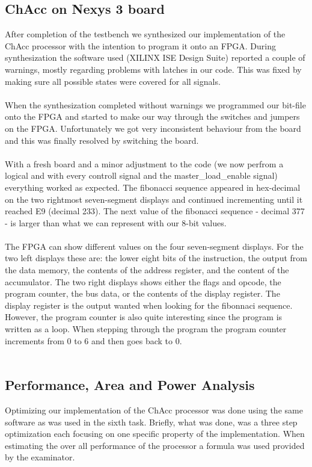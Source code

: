 \documentclass[a4paper,11pt]{article}
\begin{document}
\subsection{ChAcc on Nexys 3 board}
After completion of the testbench we synthesized our implementation of the 
ChAcc processor with the intention to program it onto an FPGA. During 
synthesization the software used (XILINX ISE Design Suite) reported a couple 
of warnings, mostly regarding problems with latches in our code. This was 
fixed by making sure all possible states were covered for all signals.\\\\
\noindent
When the synthesization completed without warnings we programmed our bit-file 
onto the FPGA and started to make our way through the switches and jumpers on 
the FPGA. Unfortunately we got very inconsistent behaviour from the board and 
this was finally resolved by switching the board.\\\\
\noindent
With a fresh board and a minor adjustment to the code (we now perfrom a 
logical and with every controll signal and the master\_load\_enable signal) 
everything worked as expected. The fibonacci sequence appeared in hex-decimal 
on the two rightmost seven-segment displays and continued incrementing until 
it reached E9 (decimal 233). The next value of the fibonacci sequence - 
decimal 377 - is larger than what we can represent with our 8-bit values.\\\\
\noindent
The FPGA can show different values on the four seven-segment displays. For 
the two left displays these are: the lower eight bits of the instruction, 
the output from the data memory, the contents of the address register, and 
the content of the accumulator. The two right displays shows either the 
flags and opcode, the program counter, the bus data, or the contents of the 
display register. The display register is the output wanted when looking for 
the fibonnaci sequence. However, the program counter is also quite interesting 
since the program is written as a loop. When stepping through the program 
the program counter increments from 0 to 6 and then goes back to 0.\\\\
\noindent

\subsection{Performance, Area and Power Analysis}
Optimizing our implementation of the ChAcc processor was done using the 
same software as was used in the sixth task. Briefly, what was done, was a 
three step optimization each focusing on one specific property of the 
implementation. When estimating the over all performance of the processor 
a formula was used provided by the examinator.
\end{document}
